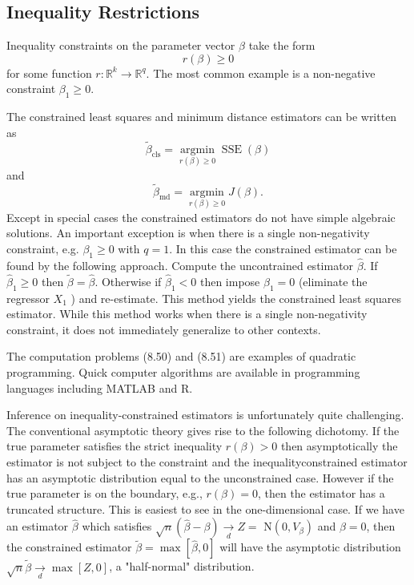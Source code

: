 \documentclass[10pt]{article}
\begin{document}
\subsection{Inequality Restrictions}
Inequality constraints on the parameter vector $\beta$ take the form
$$
r(\beta) \geq 0
$$
for some function $r: \mathbb{R}^{k} \rightarrow \mathbb{R}^{q}$. The most common example is a non-negative constraint $\beta_{1} \geq 0$.

The constrained least squares and minimum distance estimators can be written as
$$
\widetilde{\beta}_{\mathrm{cls}}=\underset{r(\beta) \geq 0}{\operatorname{argmin}} \operatorname{SSE}(\beta)
$$
and
$$
\widetilde{\beta}_{\mathrm{md}}=\underset{r(\beta) \geq 0}{\operatorname{argmin}} J(\beta) .
$$
Except in special cases the constrained estimators do not have simple algebraic solutions. An important exception is when there is a single non-negativity constraint, e.g. $\beta_{1} \geq 0$ with $q=1$. In this case the constrained estimator can be found by the following approach. Compute the uncontrained estimator $\widehat{\beta}$. If $\widehat{\beta}_{1} \geq 0$ then $\widetilde{\beta}=\widehat{\beta}$. Otherwise if $\widehat{\beta}_{1}<0$ then impose $\beta_{1}=0$ (eliminate the regressor $X_{1}$ ) and re-estimate. This method yields the constrained least squares estimator. While this method works when there is a single non-negativity constraint, it does not immediately generalize to other contexts.

The computation problems (8.50) and (8.51) are examples of quadratic programming. Quick computer algorithms are available in programming languages including MATLAB and R.

Inference on inequality-constrained estimators is unfortunately quite challenging. The conventional asymptotic theory gives rise to the following dichotomy. If the true parameter satisfies the strict inequality $r(\beta)>0$ then asymptotically the estimator is not subject to the constraint and the inequalityconstrained estimator has an asymptotic distribution equal to the unconstrained case. However if the true parameter is on the boundary, e.g., $r(\beta)=0$, then the estimator has a truncated structure. This is easiest to see in the one-dimensional case. If we have an estimator $\widehat{\beta}$ which satisfies $\sqrt{n}(\widehat{\beta}-\beta) \underset{d}{\rightarrow} Z=$ $\mathrm{N}\left(0, V_{\beta}\right)$ and $\beta=0$, then the constrained estimator $\widetilde{\beta}=\max [\widehat{\beta}, 0]$ will have the asymptotic distribution $\sqrt{n} \widetilde{\beta} \underset{d}{\longrightarrow} \max [Z, 0]$, a "half-normal" distribution.
\end{document}
